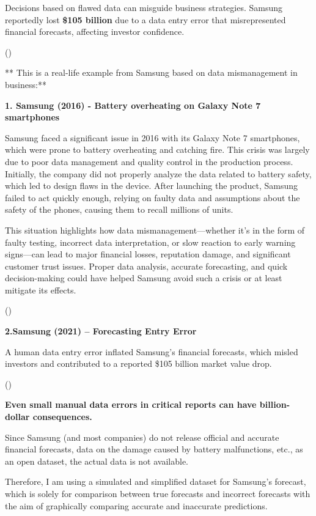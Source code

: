 \documentclass[
  man,
  floatsintext,
  longtable,
  nolmodern,
  notxfonts,
  notimes,
  colorlinks=true,linkcolor=blue,citecolor=blue,urlcolor=blue]{apa7}
\begin{document}
Decisions based on flawed data can misguide business strategies. Samsung
reportedly lost \textbf{\$105 billion} due to a data entry error that
misrepresented financial forecasts, affecting investor confidence.

()

** This is a real-life example from Samsung based on data mismanagement
in business:**

\textbf{1. Samsung (2016) - Battery overheating on Galaxy Note 7
smartphones}

Samsung faced a significant issue in 2016 with its Galaxy Note 7
smartphones, which were prone to battery overheating and catching fire.
This crisis was largely due to poor data management and quality control
in the production process. Initially, the company did not properly
analyze the data related to battery safety, which led to design flaws in
the device. After launching the product, Samsung failed to act quickly
enough, relying on faulty data and assumptions about the safety of the
phones, causing them to recall millions of units.

This situation highlights how data mismanagement---whether it's in the
form of faulty testing, incorrect data interpretation, or slow reaction
to early warning signs---can lead to major financial losses, reputation
damage, and significant customer trust issues. Proper data analysis,
accurate forecasting, and quick decision-making could have helped
Samsung avoid such a crisis or at least mitigate its effects.

()

\textbf{2.Samsung (2021) -- Forecasting Entry Error}

A human data entry error inflated Samsung's financial forecasts, which
misled investors and contributed to a reported \$105 billion market
value drop.

()

\textbf{Even small manual data errors in critical reports can have
billion-dollar consequences.}

Since Samsung (and most companies) do not release official and accurate
financial forecasts, data on the damage caused by battery malfunctions,
etc., as an open dataset, the actual data is not available.

Therefore, I am using a simulated and simplified dataset for Samsung's
forecast, which is solely for comparison between true forecasts and
incorrect forecasts with the aim of graphically comparing accurate and
inaccurate predictions.
\end{document}
